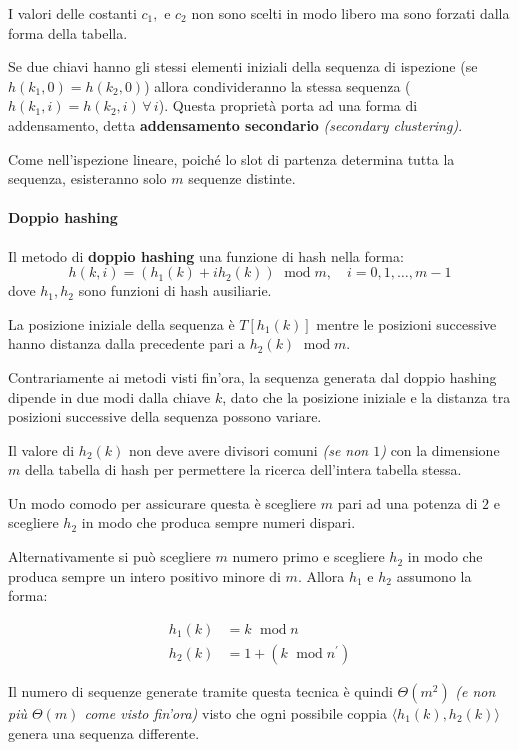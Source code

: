 \documentclass[italian, 10pt]{article}
\DeclareMathOperator{\modop}{\ mod}
\begin{document}
I valori delle costanti \(c_1,\) e \(c_2\) non sono scelti in modo libero ma sono forzati dalla forma della tabella.

\bigskip
Se due chiavi hanno gli stessi elementi iniziali della sequenza di ispezione (se \(h(k_1, 0) = h(k_2, 0)\)) allora condivideranno la stessa sequenza (\(h(k_1, i) = h(k_2, i) \, \forall \, i\)).
Questa proprietà porta ad una forma di addensamento, detta \textbf{addensamento secondario} \textit{(secondary clustering)}.

Come nell'ispezione lineare, poiché lo slot di partenza determina tutta la sequenza, esisteranno solo \(m\) sequenze distinte.

\paragraph{Doppio hashing}

Il metodo di \textbf{doppio hashing} una funzione di hash nella forma:
\[ h(k, i) = \left(h_1(k) + i h_2(k)\right) \modop m, \quad i = 0, 1, \ldots, m-1 \]
dove \(h_1, h_2\) sono funzioni di hash ausiliarie.

La posizione iniziale della sequenza è \(T\left[h_1(k)\right]\) mentre le posizioni successive hanno distanza dalla precedente pari a \(h_2(k) \modop m\).

\bigskip
Contrariamente ai metodi visti fin'ora, la sequenza generata dal doppio hashing dipende in due modi dalla chiave \(k\), dato che la posizione iniziale e la distanza tra posizioni successive della sequenza possono variare.

Il valore di \(h_2(k)\) non deve avere divisori comuni \textit{(se non \(1\))} con la dimensione \(m\) della tabella di hash per permettere la ricerca dell'intera tabella stessa.

Un modo comodo per assicurare questa è scegliere \(m\) pari ad una potenza di \(2\) e scegliere \(h_2\) in modo che produca sempre numeri dispari.

Alternativamente si può scegliere \(m\) numero primo e scegliere \(h_2\) in modo che produca sempre un intero positivo minore di \(m\).
Allora \(h_1\) e \(h_2\) assumono la forma:

\begin{align*}
  h_1(k) & = k \modop n                         \\
  h_2(k) & = 1 + \left(k \modop n^\prime\right)
\end{align*}

\bigskip
Il numero di sequenze generate tramite questa tecnica è quindi \(\Theta(m^2)\) \textit{(e non più \(\Theta(m)\) come visto fin'ora)} visto che ogni possibile coppia \(\langle h_1(k), h_2(k) \rangle\) genera una sequenza differente.
\end{document}
